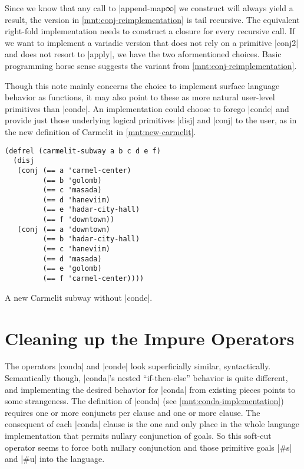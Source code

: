 \documentclass[sigplan,screen,draft,anonymous,review,natbib=false]{acmart}
\begin{document}
Since we know that any call to \rackinline|append-map∞| we construct
will always yield a result, the version in
\cref{mnt:conj-reimplementation} is tail recursive. The equivalent
right-fold implementation needs to construct a closure for every
recursive call. If we want to implement a variadic version that does
not rely on a primitive \rackinline|conj2| and does not resort to
\rackinline|apply|, we have the two aformentioned choices. Basic
programming horse sense suggests the variant from
\cref{mnt:conj-reimplementation}.

Though this note mainly concerns the choice to implement surface
language behavior as functions, it may also point to these as more
natural user-level primitives than \rackinline|conde|. An
implementation could choose to forego \rackinline|conde| and provide
just those underlying logical primitives \rackinline|disj|  and \rackinline|conj|
 to the user, as in the new definition of Carmelit in
\cref{mnt:new-carmelit}.

\begin{listing}
  \begin{verbatim}
(defrel (carmelit-subway a b c d e f)
  (disj
   (conj (== a 'carmel-center)
         (== b 'golomb)
         (== c 'masada)
         (== d 'haneviim)
         (== e 'hadar-city-hall)
         (== f 'downtown))
   (conj (== a 'downtown)
         (== b 'hadar-city-hall)
         (== c 'haneviim)
         (== d 'masada)
         (== e 'golomb)
         (== f 'carmel-center))))
  \end{verbatim}
  \caption{A new Carmelit subway without \rackinline|conde|.}
  \label{mnt:new-carmelit}
\end{listing}

\section{Cleaning up the Impure Operators}\label{sec:impure}

The operators \rackinline|conda| and \rackinline|conde| look
superficially similar, syntactically. Semantically though,
\rackinline|conda|'s nested \enquote{if-then-else} behavior is quite
different, and implementing the desired behavior for
\rackinline|conda| from existing pieces points to some strangeness.
The definition of \rackinline|conda| (see
\cref{mnt:conda-implementation}) requires one or more conjuncts per
clause and one or more clause. The consequent of each
\rackinline|conda| clause is the one and only place in the whole
language implementation that permits nullary conjunction of goals. So
this soft-cut operator seems to force both nullary conjunction and
those primitive goals \rackinline|#s| and \rackinline|#u| into the
language.
\end{document}
